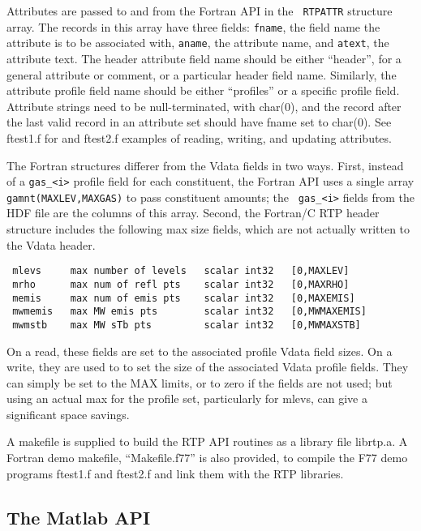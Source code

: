 \documentclass[12pt]{article}
\begin{document}
Attributes are passed to and from the Fortran API in the {\tt
RTPATTR} structure array.  The records in this array have three
fields: {\tt fname}, the field name the attribute is to be
associated with, {\tt aname}, the attribute name, and {\tt atext},
the attribute text.  The header attribute field name should be
either ``header'', for a general attribute or comment, or a
particular header field name.  Similarly, the attribute profile
field name should be either ``profiles'' or a specific profile
field.  Attribute strings need to be null-terminated, with char(0),
and the record after the last valid record in an attribute set
should have fname set to char(0).  See ftest1.f for and ftest2.f
examples of reading, writing, and updating attributes.

The Fortran structures differer from the Vdata fields in two ways.
First, instead of a {\tt gas\_<i>} profile field for each
constituent, the Fortran API uses a single array {\tt
gamnt(MAXLEV,MAXGAS)} to pass constituent amounts; the {\tt
gas\_<i>} fields from the HDF file are the columns of this array.
Second, the Fortran/C RTP header structure includes the following
max size fields, which are not actually written to the Vdata header.

\begin{verbatim}
 mlevs     max number of levels   scalar int32   [0,MAXLEV]
 mrho      max num of refl pts    scalar int32   [0,MAXRHO]
 memis     max num of emis pts    scalar int32   [0,MAXEMIS]
 mwmemis   max MW emis pts        scalar int32   [0,MWMAXEMIS]
 mwmstb    max MW sTb pts         scalar int32   [0,MWMAXSTB]
\end{verbatim}

On a read, these fields are set to the associated profile Vdata
field sizes.  On a write, they are used to to set the size of the
associated Vdata profile fields.  They can simply be set to the MAX
limits, or to zero if the fields are not used; but using an actual
max for the profile set, particularly for mlevs, can give a
significant space savings.

A makefile is supplied to build the RTP API routines as a library
file librtp.a.  A Fortran demo makefile, ``Makefile.f77'' is also
provided, to compile the F77 demo programs ftest1.f and ftest2.f
and link them with the RTP libraries.


\subsection{The Matlab API}
\end{document}

